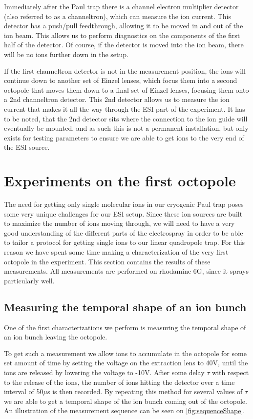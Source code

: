 Immediately after the Paul trap there is a channel electron multiplier detector (also referred to as a channeltron), which can measure the ion current. This detector has a push/pull feedthrough, allowing it to be moved in and out of the ion beam. This allows us to perform diagnostics on the components of the first half of the detector. Of course, if the detector is moved into the ion beam, there will be no ions further down in the setup.

If the first channeltron detector is not in the measurement position, the ions will continue down to another set of Einzel lenses, which focus them into a second octopole that moves them down to a final set of Einzel lenses, focusing them onto a 2nd channeltron detector. This 2nd detector allows us to measure the ion current that makes it all the way through the ESI part of the experiment.
It has to be noted, that the 2nd detector sits where the connection to the ion guide will eventually be mounted, and as such this is not a permanent installation, but only exists for testing parameters to ensure we are able to get ions to the very end of the ESI source.
\section{Experiments on the first octopole}
\label{sec:octopoleExperiments}
The need for getting only single molecular ions in our cryogenic Paul trap poses some very unique challenges for our ESI setup. Since these ion sources are built to maximize the number of ions moving through, we will need to have a very good understanding of the different parts of the electrospray in order to be able to tailor a protocol for getting single ions to our linear quadropole trap.
For this reason we have spent some time making a characterization of the very first octopole in the experiment. 
This section contains the results of these measurements. All measurements are performed on rhodamine 6G, since it sprays particularly well.

\subsection{Measuring the temporal shape of an ion bunch}
One of the first characterizations we perform is measuring the temporal shape of an ion bunch leaving the octopole.

To get such a measurement we allow ions to accumulate in the octopole for some set amount of time by setting the voltage on the extraction lens to 40V, until the ions are released by lowering the voltage to -10V. After some delay $\tau$ with respect to the release of the ions, the number of ions hitting the detector over a time interval of 50$\mu$s is then recorded. By repeating this method for several values of $\tau$ we are able to get a temporal shape of the ion bunch coming out of the octopole.
An illustration of the measurement sequence can be seen on \cref{fig:sequenceShape}. 

